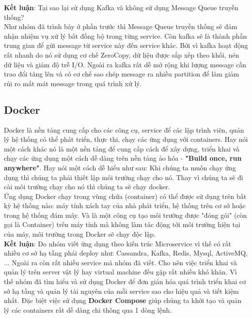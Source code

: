    
          	\textbf{Kết luận}: Tại sao lại sử dụng Kafka và không sử dụng Message Queue truyền thống? \\
            
            Như nhóm đã trình bày ở phần trước thì Message Queue truyền thống sẽ đảm nhận nhiệm vụ xử lý bất đồng bộ trong từng service. Còn kafka sẽ là thành phần trung gian để gửi message từ service này đến service khác. Bởi vì kafka hoạt động rất nhanh do nó sử dụng cơ chế ZeroCopy, dữ liệu được sắp xếp theo khối, nén dữ liệu và giảm độ trễ I/O. Ngoài ra kafka rất dễ mở rộng khi lượng message cần trao đổi tăng lên và có cơ chế sao chép message ra nhiều partition để làm giảm rủi ro mất mát message trong quá trình xử lý.
            
            \subsection{Docker}
            
            Docker\cite{docker} là nền tảng cung cấp cho các công cụ, service để các lập trình viên, quản lý hệ thống có thể phát triển, thực thi, chạy các ứng dụng với containers. Hay nói một cách khác nó là một nền tảng để cung cấp cách để xây dựng, triển khai và chạy các ứng dụng một cách dễ dàng trên nền tảng ảo hóa - \textbf{"Build once, run anywhere"}. Hay nói một cách dễ hiểu như sau: Khi chúng ta muốn chạy ứng dụng thì chúng ta phải thiết lập môi trường chạy cho nó. Thay vì chúng ta sẽ đi cài môi trường chạy cho nó thì chúng ta sẽ chạy docker.\\
            
            Ứng dụng Docker chạy trong vùng chứa (container) có thể được sử dụng trên bất kỳ hệ thống nào: máy tính xách tay của nhà phát triển, hệ thống trên cơ sở hoặc trong hệ thống đám mây. Và là một công cụ tạo môi trường được "đóng gói" (còn gọi là Container) trên máy tính mà không làm tác động tới môi trường hiện tại của máy, môi trường trong Docker sẽ chạy độc lập.\\
            
            \textbf{Kết luận}: Do nhóm viết ứng dụng theo kiến trúc Microservice vì thế có rất nhiều cơ sở hạ tầng phải deploy như: Cassandra, Kafka, Redis, Mysql, ActiveMQ, ... Ngoài ra còn rất nhiều service mà nhóm đã viết. Cho nên việc triển khai và quản lý trên server vật lý hay virtual machine đều gặp rất nhiều khó khăn. Vì thế nhóm đã tìm hiểu và sử dụng Docker để đơn giản hóa quá trình triển khai cơ sở hạ tầng và quản lý tài nguyên của mỗi service sao cho hiệu quả và tiết kiệm nhất. Đặc biệt việc sử dụng \textbf{Docker Compose} giúp chúng ta khởi tạo và quản lý các containers rất dễ dàng chi thông qua 1 dòng lệnh.
            
